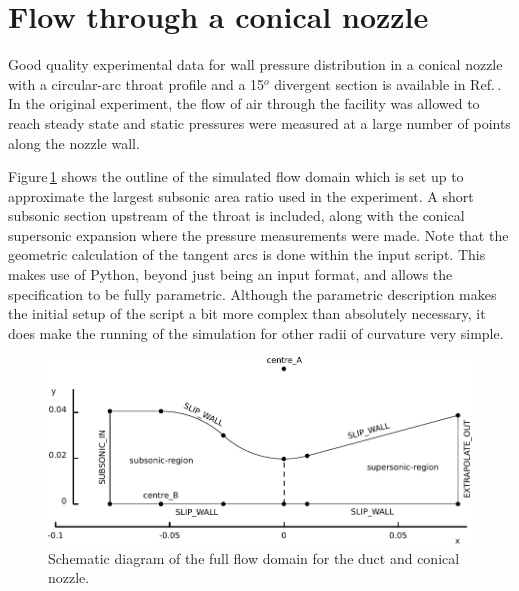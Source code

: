 
\newpage
\section{Flow through a conical nozzle}
\label{back-nozzle-sec}
%
Good quality experimental data for wall pressure distribution in a conical
nozzle with a circular-arc throat profile and a 15$^o$ divergent section
is available in Ref.\,\cite{back_etal_1965a}.
In the original experiment, the flow of air through the facility 
was allowed to reach steady state and static pressures were measured 
at a large number of points along the nozzle wall.


Figure\,\ref{back-geometry-fig} shows the outline of the simulated flow
domain which is set up to approximate the largest subsonic area ratio
used in the experiment.
A short subsonic section upstream of the throat is included, along with
the conical supersonic expansion where the pressure measurements were made.
Note that the geometric calculation of the tangent arcs is done within the
input script.
This makes use of Python, beyond just being an input format, and allows the
specification to be fully parametric.
Although the parametric description makes the initial setup of the script 
a bit more complex than absolutely necessary, 
it does make the running of the simulation for other radii of curvature 
very simple.

\begin{figure}[htbp]
\begin{center}
\includegraphics[width=\textwidth]{../2D/back-nozzle/back-layout.pdf}
\end{center}
\caption{Schematic diagram of the full flow domain for the duct and conical nozzle.}
\label{back-geometry-fig}
\end{figure}

